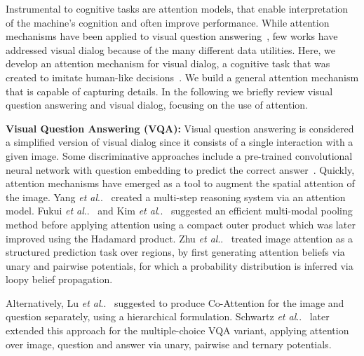 \documentclass[10pt,twocolumn,letterpaper]{article}
\makeatletter
\def\@onedot{\ifx\@let@token.\else.\null\fi\xspace}
\DeclareRobustCommand\onedot{\futurelet\@let@token\@onedot}
\def\etal{\emph{et al}\onedot}
\makeatother
\begin{document}
Instrumental to cognitive tasks are attention models, that enable interpretation of the machine's cognition and often improve  performance.  
While attention mechanisms have been applied to visual question answering~\cite{FukuiARXIV2016,lu2016hierarchical, SchwartzNIPS2017,kim2017structured,XuARXIV2015,zhu2017structured}, few works have addressed visual dialog because of the many different data utilities. Here, we develop an attention mechanism for visual dialog, a cognitive task that was created to imitate human-like decisions~\cite{visdial}. We  build a general attention mechanism that is capable of capturing details. In the following we briefly review visual question answering and visual dialog, focusing on  the use of attention. 

\noindent\textbf{Visual Question Answering (VQA):}
Visual question answering is considered a simplified version of visual dialog since it consists of a single interaction with a given image. Some discriminative approaches include a pre-trained convolutional neural network with question embedding to predict the correct answer~\cite{Simonyan14c, MalinowskiICCV2015}. Quickly, attention mechanisms have emerged as a tool to augment the spatial attention of the image. Yang \etal~\cite{yang2016stacked} created a multi-step reasoning system via an attention model. Fukui \etal~\cite{FukuiARXIV2016} and Kim \etal~\cite{kim2016hadamard} suggested an efficient multi-modal pooling method before applying attention using a compact outer product which was later improved using the Hadamard product. Zhu \etal~\cite{zhu2017structured} treated image attention as a structured prediction task over regions, by first generating attention beliefs via unary and pairwise potentials, for which a probability distribution is inferred via loopy belief propagation.  

Alternatively, Lu \etal~\cite{lu2016hierarchical} suggested to produce Co-Attention for the image and question separately, using a hierarchical formulation. Schwartz \etal~\cite{SchwartzNIPS2017} later extended this approach for the multiple-choice VQA variant,  applying attention over image, question and answer via unary, pairwise and ternary potentials. 
\end{document}
